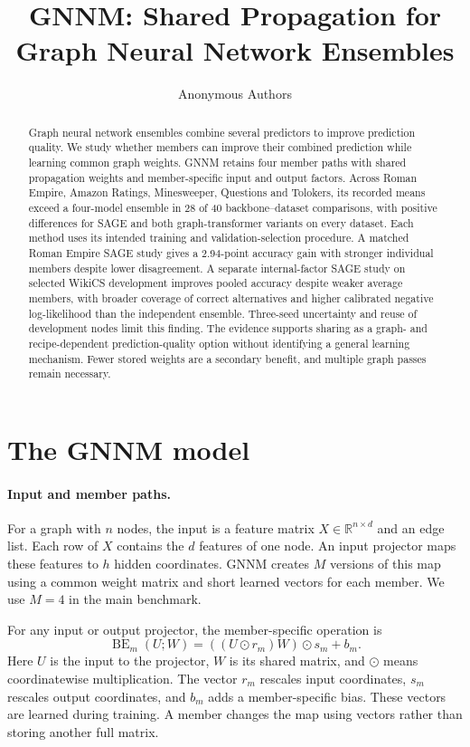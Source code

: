 \documentclass{article}
\title{GNNM: Shared Propagation for Graph Neural Network Ensembles}
\author{Anonymous Authors}
\begin{document}
\maketitle

\begin{abstract}
Graph neural network ensembles combine several predictors to improve prediction quality. We study whether members can improve their combined prediction while learning common graph weights. GNNM retains four member paths with shared propagation weights and member-specific input and output factors. Across Roman Empire, Amazon Ratings, Minesweeper, Questions and Tolokers, its recorded means exceed a four-model ensemble in 28 of 40 backbone--dataset comparisons, with positive differences for SAGE and both graph-transformer variants on every dataset. Each method uses its intended training and validation-selection procedure. A matched Roman Empire SAGE study gives a 2.94-point accuracy gain with stronger individual members despite lower disagreement. A separate internal-factor SAGE study on selected WikiCS development improves pooled accuracy despite weaker average members, with broader coverage of correct alternatives and higher calibrated negative log-likelihood than the independent ensemble. Three-seed uncertainty and reuse of development nodes limit this finding. The evidence supports sharing as a graph- and recipe-dependent prediction-quality option without identifying a general learning mechanism. Fewer stored weights are a secondary benefit, and multiple graph passes remain necessary.
\end{abstract}



\section{The GNNM model}\label{sec:method}
\paragraph{Input and member paths.}
For a graph with $n$ nodes, the input is a feature matrix $X\in\mathbb{R}^{n\times d}$ and an edge list. Each row of $X$ contains the $d$ features of one node. An input projector maps these features to $h$ hidden coordinates. GNNM creates $M$ versions of this map using a common weight matrix and short learned vectors for each member. We use $M=4$ in the main benchmark.

For any input or output projector, the member-specific operation is
\begin{equation}\label{eq:be}
\operatorname{BE}_m(U;W)=((U\odot r_m)W)\odot s_m+b_m.
\end{equation}
Here $U$ is the input to the projector, $W$ is its shared matrix, and $\odot$ means coordinatewise multiplication. The vector $r_m$ rescales input coordinates, $s_m$ rescales output coordinates, and $b_m$ adds a member-specific bias. These vectors are learned during training. A member changes the map using vectors rather than storing another full matrix.
\end{document}
